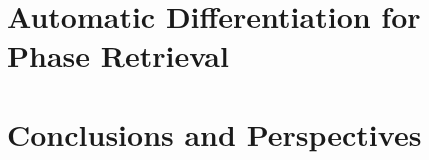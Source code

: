 \documentclass[12pt]{book}
\begin{document}
\chapter{Automatic Differentiation for Phase Retrieval}
\label{chap:AD_phase_retrieval}


\chapter{Conclusions and Perspectives}
\label{chap:conclusions}


% 


% 
\printbibliography
{}


% 
\end{document}
